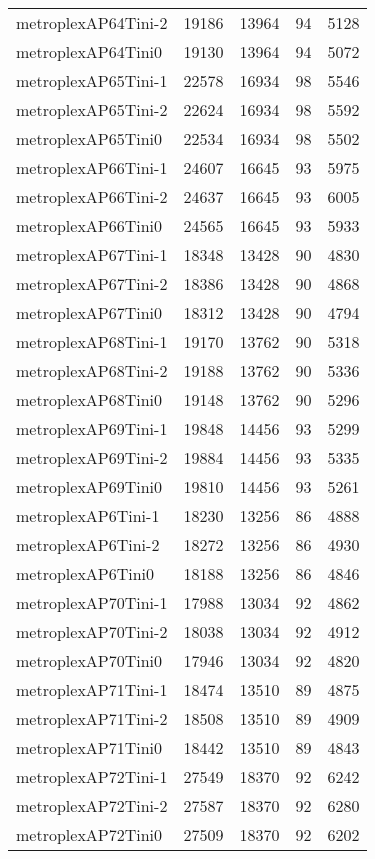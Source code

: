\begin{tabular}{lrrrr}
metroplexAP64Tini-2 & 19186 & 13964 & 94 & 5128 \\
metroplexAP64Tini0 & 19130 & 13964 & 94 & 5072 \\
metroplexAP65Tini-1 & 22578 & 16934 & 98 & 5546 \\
metroplexAP65Tini-2 & 22624 & 16934 & 98 & 5592 \\
metroplexAP65Tini0 & 22534 & 16934 & 98 & 5502 \\
metroplexAP66Tini-1 & 24607 & 16645 & 93 & 5975 \\
metroplexAP66Tini-2 & 24637 & 16645 & 93 & 6005 \\
metroplexAP66Tini0 & 24565 & 16645 & 93 & 5933 \\
metroplexAP67Tini-1 & 18348 & 13428 & 90 & 4830 \\
metroplexAP67Tini-2 & 18386 & 13428 & 90 & 4868 \\
metroplexAP67Tini0 & 18312 & 13428 & 90 & 4794 \\
metroplexAP68Tini-1 & 19170 & 13762 & 90 & 5318 \\
metroplexAP68Tini-2 & 19188 & 13762 & 90 & 5336 \\
metroplexAP68Tini0 & 19148 & 13762 & 90 & 5296 \\
metroplexAP69Tini-1 & 19848 & 14456 & 93 & 5299 \\
metroplexAP69Tini-2 & 19884 & 14456 & 93 & 5335 \\
metroplexAP69Tini0 & 19810 & 14456 & 93 & 5261 \\
metroplexAP6Tini-1 & 18230 & 13256 & 86 & 4888 \\
metroplexAP6Tini-2 & 18272 & 13256 & 86 & 4930 \\
metroplexAP6Tini0 & 18188 & 13256 & 86 & 4846 \\
metroplexAP70Tini-1 & 17988 & 13034 & 92 & 4862 \\
metroplexAP70Tini-2 & 18038 & 13034 & 92 & 4912 \\
metroplexAP70Tini0 & 17946 & 13034 & 92 & 4820 \\
metroplexAP71Tini-1 & 18474 & 13510 & 89 & 4875 \\
metroplexAP71Tini-2 & 18508 & 13510 & 89 & 4909 \\
metroplexAP71Tini0 & 18442 & 13510 & 89 & 4843 \\
metroplexAP72Tini-1 & 27549 & 18370 & 92 & 6242 \\
metroplexAP72Tini-2 & 27587 & 18370 & 92 & 6280 \\
metroplexAP72Tini0 & 27509 & 18370 & 92 & 6202 \\

\end{tabular}
